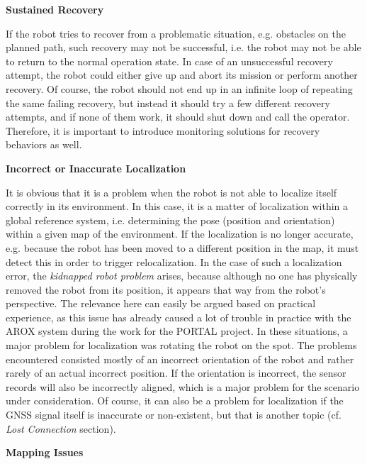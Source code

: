 \documentclass[english, master, utf8]{base/thesis_KBS}
\begin{document}
\noindent
\textbf{Sustained Recovery}\newline

\noindent
If the robot tries to recover from a problematic situation, e.g. obstacles on the planned path, such recovery may not be successful, i.e. the robot may not be able
to return to the normal operation state. In case of an unsuccessful recovery attempt, the robot could either give up and abort its mission or perform another recovery.
Of course, the robot should not end up in an infinite loop of repeating the same failing recovery, but instead it should try a few different recovery attempts,
and if none of them work, it should shut down and call the operator. Therefore, it is important to introduce monitoring solutions for recovery behaviors as well.\newline

\noindent
\textbf{Incorrect or Inaccurate Localization}\newline

\noindent
It is obvious that it is a problem when the robot is not able to localize itself correctly in its environment.
In this case, it is a matter of localization within a global reference system, i.e. determining the pose (position and orientation) within a given map of the environment.
If the localization is no longer accurate, e.g. because the robot has been moved to a different position in the map, it must detect this in order to
trigger relocalization. In the case of such a localization error, the \textit{kidnapped robot problem} arises, because although no one has 
physically removed the robot from its position, it appears that way from the robot's perspective. \cite{Hertzberg:2012}
The relevance here can easily be argued based on practical experience, as this issue has already caused a lot of trouble in practice with the AROX system during 
the work for the PORTAL project. In these situations, a major problem for localization was rotating the robot on the spot.
The problems encountered consisted mostly of an incorrect orientation of the robot and rather rarely of an actual incorrect position.
If the orientation is incorrect, the sensor records will also be incorrectly aligned, which is a major problem for the scenario under consideration.
Of course, it can also be a problem for localization if the GNSS signal itself is inaccurate or non-existent, but that is another topic (cf. \textit{Lost Connection} section).\newline

\noindent
\textbf{Mapping Issues}\newline
\end{document}
